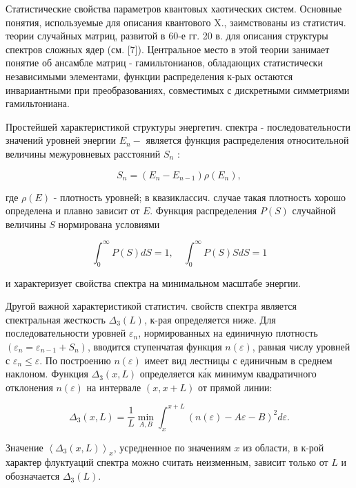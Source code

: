 \documentclass[10pt]{article}
\begin{document}
Статистические свойства параметров квантовых хаотических систем. Основные понятия, используемые для описания квантового X., заимствованы из статистич. теории случайных матриц, развитой в 60-е гг. 20 в. для описания структуры спектров сложных ядер (см. [7]). Центральное место в этой теории занимает понятие об ансамбле матриц - гамильтонианов, обладающих статистически независимыми элементами, функции распределения к-рых остаются инвариантными при преобразованиях, совместимых с дискретными симметриями гамильтониана.



Простейшей характеристикой структуры энергетич. спектра - последовательности значений уровней энергии $E_{n}-$ является функция распределения относительной величины межуровневых расстояний $S_{n}$ :



\[

S_{n}=\left(E_{n}-E_{n-1}\right) \rho\left(E_{n}\right),

\]



где $\rho(E)$ - плотность уровней; в квазиклассич. случае такая плотность хорошо определена и плавно зависит от $E$. Функция распределения $P(S)$ случайной величины $S$ нормирована условиями



\[

\int_{0}^{\infty} P(S) d S=1, \quad \int_{0}^{\infty} P(S) S d S=1

\]



и характеризует свойства спектра на минимальном масштабе энергии.



Другой важной характеристикой статистич. свойств спектра является спектральная жесткость $\Delta_{3}(L)$, к-рая определяется ниже. Для последовательности уровней $\varepsilon_{n}$, нормированных на единичную плотность $\left(\varepsilon_{n}=\varepsilon_{n-1}+S_{n}\right)$, вводится ступенчатая функция $n(\varepsilon)$, равная числу уровней с $\varepsilon_{n} \leqslant \varepsilon$. По построению $n(\varepsilon)$ имеет вид лестницы с единичным в среднем наклоном. Функция $\Delta_{3}(x, L)$ определяется ка́к минимум квадратичного отклонения $n(\varepsilon)$ на интервале $(x, x+L)$ от прямой линии:



\[

\Delta_{3}(x, L)=\frac{1}{L} \min _{A, B} \int_{x}^{x+L}(n(\varepsilon)-A \varepsilon-B)^{2} d \varepsilon .

\]



Значение $\left\langle\Delta_{3}(x, L)\right\rangle_{x}$, усредненное по значениям $x$ из области, в к-рой характер флуктуаций спектра можно считать неизменным, зависит только от $L$ и обозначается $\Delta_{3}(L)$.
\end{document}
